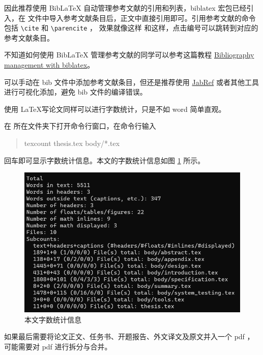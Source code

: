 因此推荐使用 BibLaTeX 自动管理参考文献的引用和列表，biblatex 宏包已经引入，在  文件中导入参考文献条目后，正文中直接引用即可。引用参考文献的命令包括 \verb!\cite! 和 \verb!\parencite! ， 效果就像这样 \cite{sample} 和这样\parencite{sample}，点击编号可以跳转到对应的参考文献条目。

不知道如何使用 BibLaTeX 管理参考文献的同学可以参考这篇教程 \href{https://www.overleaf.com/learn/latex/Bibliography_management_with_biblatex}{Bibliography management with biblatex}。

可以手动在 bib 文件中添加参考文献条目，但还是推荐使用 \href{https://www.jabref.org/}{JabRef} 或者其他工具进行可视化添加，避免 bib 文件的编译错误。


使用 \LaTeX 写论文同样可以进行字数统计，只是不如 word 简单直观。

在  所在文件夹下打开命令行窗口，在命令行输入 

\begin{quote}
texcount thesis.tex body/*.tex
\end{quote}

回车即可显示字数统计信息。本文的字数统计信息如图 \ref{fig:specification:texcount} 所示。

\begin{figure}[htbp]  %
  \centering  %
  \includegraphics[scale=.5]{figure/texcount.png}  %
  \caption{本文字数统计信息}  %
  \label{fig:specification:texcount}  %
\end{figure}

如果最后需要将论文正文、任务书、开题报告、外文译文及原文并入一个 pdf ，可能需要对 pdf 进行拆分与合并。

